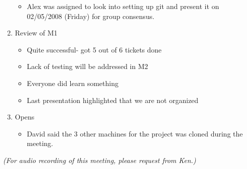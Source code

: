 \documentclass{letter}
\begin{document}
\begin{enumerate}
\begin{itemize}
\begin{itemize}
\begin{itemize}
						\end{itemize}
				\end{itemize}
			\item Alex was assigned to look into setting up git and present it on 02/05/2008 (Friday) for group consensus.
		\end{itemize}
	\item Review of M1
		\begin{itemize}
			\item Quite successful- got 5 out of 6 tickets done
			\item Lack of testing will be addressed in M2
			\item Everyone did learn something
			\item Last presentation highlighted that we are not organized
		\end{itemize}
	\item Opens
		\begin{itemize}
			\item David said the 3 other machines for the project was cloned during the meeting. 
		\end{itemize}
\end{enumerate} 
\textsl{(For audio recording of this meeting, please request from Ken.)}
\end{document}
